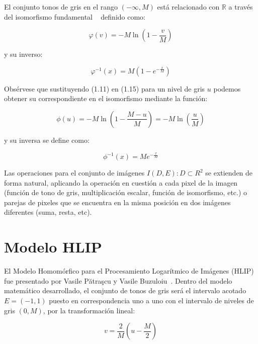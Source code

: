 El conjunto tonos de gris en el rango $(-\infty, M)$ está relacionado con $\mathbb{R}$ a través del isomorfismo fundamental ~\cite{jourlin2016logarithmic} definido como:

\begin{equation}
	\varphi(v) = -M\ln\left(1-\frac{v}{M}\right)
\end{equation}

y su inverso:

\begin{equation}
	\varphi^{-1} (x) = M\left(1-e^{-\frac{x}{M}}\right)
\end{equation}


Obs\'ervese que sustituyendo (1.11) en (1.15) para un nivel de gris $u$ podemos obtener su correspondiente en el isomorfismo mediante la funci\'on:

\begin{equation}
	\phi(u) = -M\ln\left(1-\frac{M-u}{M}\right) = -M\ln\left(\frac{u}{M}\right)
\end{equation}

y su inversa se define como:

\begin{equation}
	\phi^{-1}(x) = Me^{-\frac{x}{M}} 
\end{equation}

Las operaciones para el conjunto de im\'agenes $I(D,E):D\subset R^2$ se extienden de forma natural, aplicando la operaci\'on en cuesti\'on a cada pixel de la imagen (funci\'on de tono de gris, multiplicaci\'on escalar, funci\'on de isomorfismo, etc.) o parejas de pixeles que se encuentra en la misma posici\'on en dos im\'agenes diferentes (suma, resta, etc). 

\section{Modelo HLIP}

El Modelo Homom\'orfico para el Procesamiento Logar\'itmico de Im\'agenes (HLIP) fue presentado por Vasile Pătraşcu y Vasile Buzuloiu~\cite{patrascu2014mathematical}. Dentro del modelo matemático desarrollado, el conjunto de tonos de gris será el intervalo acotado $E = (-1, 1)$ puesto en correspondencia uno a uno con el intervalo de niveles de gris $(0,M)$, por la transformaci\'on lineal:

\begin{equation}
	v=\frac{2}{M}\left(u-\frac{M}{2}\right)
\end{equation}

